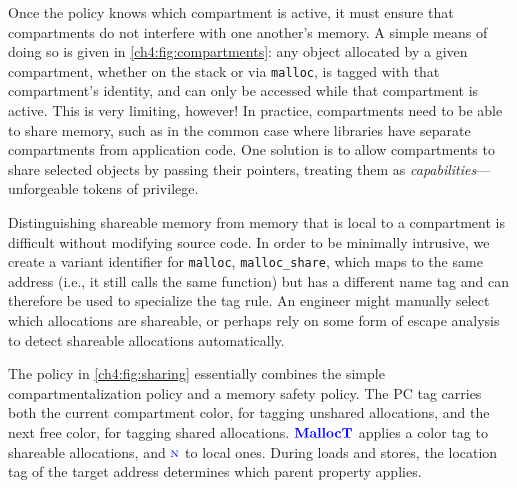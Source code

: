 Once the policy knows which compartment is active, it must ensure that compartments do not interfere with
one another's memory. A simple means of doing so is given in \cref{ch4:fig:compartments}: any object allocated by
a given compartment, whether on the stack or via {\tt malloc}, is tagged with that compartment's identity,
and can only be accessed while that compartment is active.
This is very limiting, however! In practice, compartments need to be able to share memory, such as in the
common case where libraries have separate compartments from application code. One solution is to allow
compartments to share selected objects by passing their pointers, treating them as
{\em capabilities}---unforgeable tokens of privilege.

Distinguishing shareable memory from memory that is local to a compartment is difficult
without modifying source code. In order to be minimally intrusive, we
create a variant identifier for {\tt malloc}, {\tt malloc\_share}, which maps to the same
address (i.e., it still calls the same function) but has a different name tag and can therefore
be used to specialize the tag rule. An engineer might manually select which allocations are
shareable, or perhaps rely on some form of escape analysis to detect shareable allocations automatically.

The policy in \cref{ch4:fig:sharing} essentially combines the simple compartmentalization policy
and a memory safety policy. The PC tag carries both the current compartment color, for tagging
unshared allocations, and the next free color, for tagging shared allocations.
\(\color{blue} \mathbf{MallocT}\) applies a color tag to shareable allocations, and \(\textnormal{\color{blue} \sc n}\) to local ones.
During loads and stores, the location tag of the target address
determines which parent property applies.

